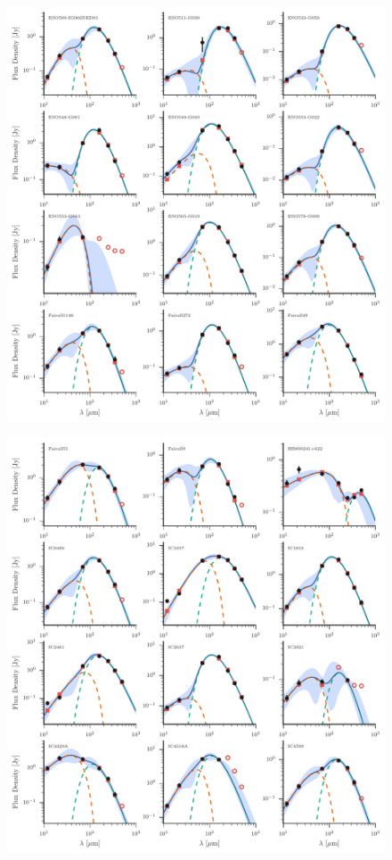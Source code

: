 \begin{figure}
\centering
\includegraphics[width=\textwidth]{figures/sedfig10}
\caption{}
\end{figure}

\begin{figure}
\centering
\includegraphics[width=\textwidth]{figures/sedfig11}
\caption{}
\end{figure}

